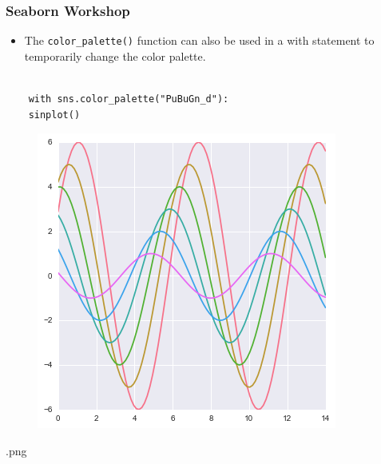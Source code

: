\documentclass{beamer}
\begin{document}
\begin{frame}[fragile]
	\frametitle{Seaborn Workshop}
	\large
	\begin{itemize}
		\item The \texttt{color\_palette()} function can also be used in a with statement to temporarily change the color palette.
	\end{itemize}
	\begin{verbatim}
	
	with sns.color_palette("PuBuGn_d"):
	sinplot()
	\end{verbatim}
	
	\begin{figure}
		\centering
		\includegraphics[width=0.7\linewidth]{images/color_palettes_67_0}
	\end{figure}.png
\end{frame}
\end{document}
